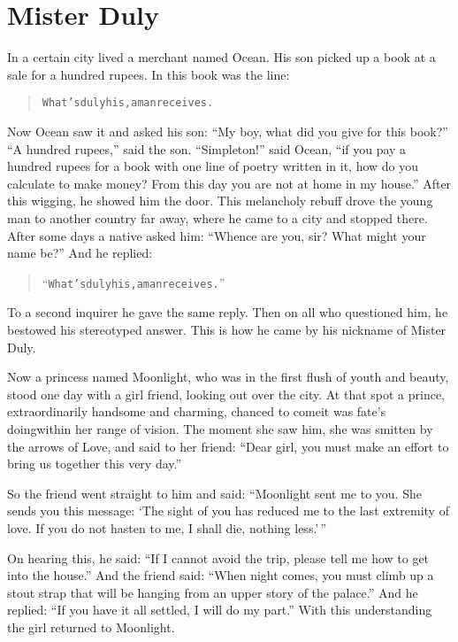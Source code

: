 \documentclass[article, twoside, 14pt]{memoir}
\renewenvironment{verbatim}{%
\begin{quote}%
\vskip -10pt%
\begin{alltt}\normalfont\large}{\end{alltt}%
\end{quote}%
\vskip -10pt
} %
\begin{document}
\chapter{Mister Duly}

\label{s41}

In a certain city lived a merchant named Ocean. His son picked up a
book at a sale for a hundred rupees. In this book was the line:

\begin{verbatim}
What's duly his, a man receives.
\end{verbatim}
Now Ocean saw it and asked his son:
``My boy, what did you give for this book?'' ``A hundred rupees,''
said the son. ``Simpleton!'' said Ocean,
``if you pay a hundred rupees for a book with one line of poetry written in it, how do you calculate to make money? From this day you are not at home in my house.''
After this wigging, he showed him the door. This melancholy rebuff
drove the young man to another country far away, where he came to a
city and stopped there. After some days a native asked him:
``Whence are you, sir? What might your name be?'' And he replied:

\begin{verbatim}
“What's duly his, a man receives.”
\end{verbatim}
To a second inquirer he gave the same reply. Then on all who
questioned him, he bestowed his stereotyped answer. This is how he
came by his nickname of Mister Duly.

Now a princess named Moonlight, who was in the first flush of youth
and beauty, stood one day with a girl friend, looking out over the
city. At that spot a prince, extraordinarily handsome and charming,
chanced to come{\textemdash}it was fate's doing{\textemdash}within her range of vision.
The moment she saw him, she was smitten by the arrows of Love, and
said to her friend:
``Dear girl, you must make an effort to bring us together this very day.''

So the friend went straight to him and said:
``Moonlight sent me to you. She sends you this message: `The sight of you has reduced me to the last extremity of love. If you do not hasten to me, I shall die, nothing less.'\,''

On hearing this, he said:
``If I cannot avoid the trip, please tell me how to get into the house.''
And the friend said:
``When night comes, you must climb up a stout strap that will be hanging from an upper story of the palace.''
And he replied: ``If you have it all settled, I will do my part.''
With this understanding the girl returned to Moonlight.
\end{document}
